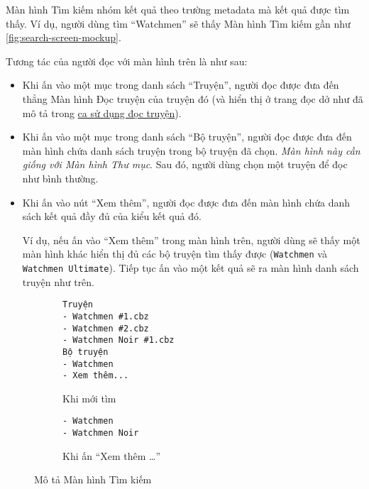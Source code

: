 \documentclass[../../thesis]{subfiles}
\begin{document}
Màn hình Tìm kiếm nhóm kết quả theo trường metadata mà kết quả được tìm thấy. Ví
dụ, người dùng tìm ``Watchmen'' sẽ thấy Màn hình Tìm kiếm gần như
\autoref{fig:search-screen-mockup}.

Tương tác của người đọc với màn hình trên là như sau:

\begin{itemize}
    \item
        Khi ấn vào một mục trong danh sách ``Truyện'', người đọc được đưa đến
        thẳng Màn hình Đọc truyện của truyện đó (và hiển thị ở trang đọc dở như
        đã mô tả trong \hyperref[sec:read-comic]{ca sử dụng đọc truyện}).
    \item
        Khi ấn vào một mục trong danh sách ``Bộ truyện'', người đọc được đưa đến
        màn hình chứa danh sách truyện trong bộ truyện đã chọn. \emph{Màn hình
        này cần giống với Màn hình Thư mục}. Sau đó, người dùng chọn một truyện
        để đọc như bình thường.
    \item
        Khi ấn vào nút ``Xem thêm'', người đọc được đưa đến màn hình chứa danh
        sách kết quả đầy đủ của kiểu kết quả đó.

        Ví dụ, nếu ấn vào ``Xem thêm'' trong màn hình trên, người dùng sẽ thấy
        một màn hình khác hiển thị đủ các bộ truyện tìm thấy được
        (\texttt{Watchmen} và \texttt{Watchmen Ultimate}). Tiếp tục ấn vào một
        kết quả sẽ ra màn hình danh sách truyện như trên.
\end{itemize}

\begin{wrapfigure}[14]{r}{6.5cm}
\vspace*{-6mm}

\begin{subfigure}[b]{0.4\textwidth}
\begin{verbatim}
Truyện
- Watchmen #1.cbz
- Watchmen #2.cbz
- Watchmen Noir #1.cbz
Bộ truyện
- Watchmen
- Xem thêm...
\end{verbatim}

\vspace*{-3mm}
\caption{Khi mới tìm}
\end{subfigure}

\vspace*{6mm}

\begin{subfigure}[b]{0.4\textwidth}
\begin{verbatim}
- Watchmen
- Watchmen Noir
\end{verbatim}

\vspace*{-3mm}
\caption{Khi ấn ``Xem thêm \ldots''}
\end{subfigure}

\caption{Mô tả Màn hình Tìm kiếm}
\label{fig:search-screen-mockup}
\end{wrapfigure}
\end{document}
